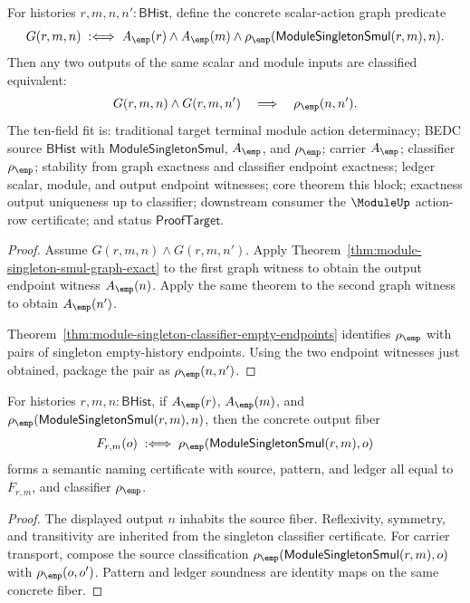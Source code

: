 \begin{theorem}
\label{thm:module-singleton-smul-graph-output-determinacy}
For histories $r,m,n,n':\mathsf{BHist}$, define the concrete scalar-action
graph predicate
$$
G(r,m,n)\;:\Longleftrightarrow\;
A_{\emp}(r)\land A_{\emp}(m)\land
\rho_{\emp}(\mathsf{ModuleSingletonSmul}(r,m),n).
$$
Then any two outputs of the same scalar and module inputs are classified
equivalent:
$$
G(r,m,n)\land G(r,m,n')\quad\Longrightarrow\quad \rho_{\emp}(n,n').
$$
The ten-field fit is: traditional target terminal module action determinacy;
BEDC source $\mathsf{BHist}$ with $\mathsf{ModuleSingletonSmul}$, $A_{\emp}$,
and $\rho_{\emp}$; carrier $A_{\emp}$; classifier $\rho_{\emp}$; stability
from graph exactness and classifier endpoint exactness; ledger scalar, module,
and output endpoint witnesses; core theorem this block; exactness output
uniqueness up to classifier; downstream consumer the $\ModuleUp$ action-row
certificate; and status $\mathsf{ProofTarget}$.
\end{theorem}
\begin{proof}
Assume $G(r,m,n)\land G(r,m,n')$. Apply
Theorem~\ref{thm:module-singleton-smul-graph-exact} to the first graph witness
to obtain the output endpoint witness $A_{\emp}(n)$. Apply the same theorem to
the second graph witness to obtain $A_{\emp}(n')$.

Theorem~\ref{thm:module-singleton-classifier-empty-endpoints} identifies
$\rho_{\emp}$ with pairs of singleton empty-history endpoints. Using the two
endpoint witnesses just obtained, package the pair as
$\rho_{\emp}(n,n')$.
\end{proof}

\begin{theorem}
\label{thm:module-singleton-smul-output-fiber-semantic-name-cert}
For histories \(r,m,n:\mathsf{BHist}\), if \(A_{\emp}(r)\),
\(A_{\emp}(m)\), and
\(\rho_{\emp}(\mathsf{ModuleSingletonSmul}(r,m),n)\), then the concrete output
fiber
$$
F_{r,m}(o)\;:\Longleftrightarrow\;
\rho_{\emp}(\mathsf{ModuleSingletonSmul}(r,m),o)
$$
forms a semantic naming certificate with source, pattern, and ledger all equal
to \(F_{r,m}\), and classifier \(\rho_{\emp}\).
\end{theorem}
\begin{proof}
The displayed output \(n\) inhabits the source fiber. Reflexivity, symmetry,
and transitivity are inherited from the singleton classifier certificate. For
carrier transport, compose the source classification
\(\rho_{\emp}(\mathsf{ModuleSingletonSmul}(r,m),o)\) with
\(\rho_{\emp}(o,o')\). Pattern and ledger soundness are identity maps on the
same concrete fiber.
\end{proof}

